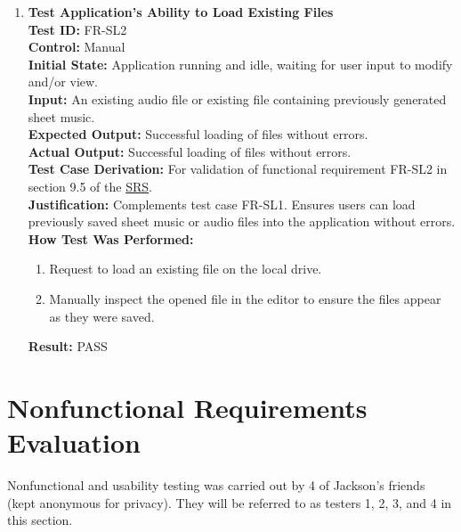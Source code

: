 \documentclass[12pt, titlepage]{article}
\begin{document}
\begin{enumerate}
    \item \textbf{Test Application’s Ability to Load Existing Files} \\
      \newline
      \textbf{Test ID:} FR-SL2 \\
      \textbf{Control:} Manual \\
      \textbf{Initial State:} Application running and idle, waiting for user input to modify and/or view. \\
      \textbf{Input:} An existing audio file or existing file containing previously generated sheet music. \\
      \textbf{Expected Output:} Successful loading of files without errors. \\
      \textbf{Actual Output:} Successful loading of files without errors.\\
      \textbf{Test Case Derivation:} For validation of functional requirement FR-SL2 in section 9.5 of the 
      \href{https://github.com/emilyperica/ScoreGen/blob/main/docs/SRS-Volere/SRS.pdf}{SRS}. \\
      \textbf{Justification:} Complements test case FR-SL1. Ensures users can load previously saved sheet music or 
      audio files into the application without errors.\\
      \textbf{How Test Was Performed:}
      \begin{enumerate}
          \item Request to load an existing file on the local drive.
          \item Manually inspect the opened file in the editor to ensure the files appear as they were saved.
      \end{enumerate}
      \textbf{Result:} PASS
  \end{enumerate}

\section{Nonfunctional Requirements Evaluation}
Nonfunctional and usability testing was carried out by 4 of Jackson's friends (kept anonymous for privacy). 
They will be referred to as testers 1, 2, 3, and 4 in this section.
\end{document}

